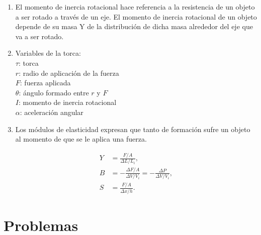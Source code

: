 \documentclass{article}
\begin{document}
\begin{enumerate}
\item El momento de inercia rotacional hace referencia a la resistencia de un
objeto a ser rotado a través de un eje. El momento de inercia rotacional de un
objeto depende de su masa Y de la distribución de dicha masa alrededor del eje
que va a ser rotado.

\item Variables de la torca:\\
$\tau$: torca\\
$r$: radio de aplicación de la fuerza\\
$F$: fuerza aplicada\\
$\theta$: ángulo formado entre $r$ y $F$\\
$I$: momento de inercia rotacional\\
$\alpha$: aceleración angular\\

\item Los módulos de elasticidad expresan que tanto de formación sufre un
objeto al momento de que se le aplica una fuerza.

\begin{align*}
Y &=  \frac{F/A}{\Delta L/L_{i}}, \\
B &= -\frac{\Delta F/A }{\Delta V / V_{i}} 
= -\frac{\Delta P}{\Delta V / V_{i}}, \\
S &=  \frac{F/A}{\Delta x / h}. 
\end{align*}

\end{enumerate}

\section{Problemas} %
\label{sec:secproblemas}
\end{document}
